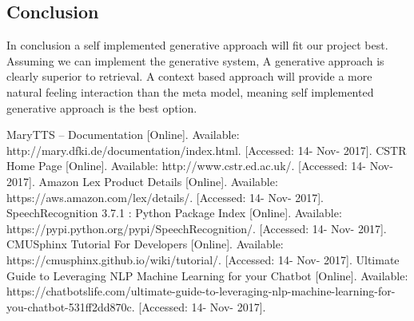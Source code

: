 \documentclass[onecolumn, draftclsnofoot,10pt, compsoc]{IEEEtran}
\begin{document}
    \subsection{Conclusion}
    In conclusion a self implemented generative approach will fit our project best. Assuming we can implement the generative system, A generative approach is clearly superior to retrieval. A context based approach will provide a more natural feeling interaction than the meta model, meaning self implemented generative approach is the best option.
\begin{thebibliography}{}
MaryTTS – Documentation [Online]. Available: http://mary.dfki.de/documentation/index.html. [Accessed: 14- Nov- 2017].
CSTR Home Page [Online]. Available: http://www.cstr.ed.ac.uk/. [Accessed: 14- Nov- 2017].
Amazon Lex Product Details [Online]. Available: https://aws.amazon.com/lex/details/. [Accessed: 14- Nov- 2017].
SpeechRecognition 3.7.1 : Python Package Index [Online]. Available: https://pypi.python.org/pypi/SpeechRecognition/. [Accessed: 14- Nov- 2017].
CMUSphinx Tutorial For Developers [Online]. Available: https://cmusphinx.github.io/wiki/tutorial/. [Accessed: 14- Nov- 2017].
Ultimate Guide to Leveraging NLP Machine Learning for your Chatbot [Online]. Available: https://chatbotslife.com/ultimate-guide-to-leveraging-nlp-machine-learning-for-you-chatbot-531ff2dd870c. [Accessed: 14- Nov- 2017].
\end{thebibliography}
\end{document}
